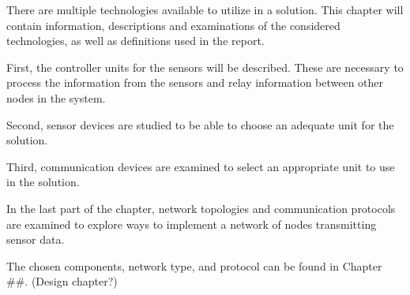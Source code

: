 \label{cha:technologies}
There are multiple technologies available to utilize in a solution. This chapter will contain information, descriptions and examinations of the considered technologies, as well as definitions used in the report.

First, the controller units for the sensors will be described. These are necessary to process the information from the sensors and relay information between other nodes in the system.

Second, sensor devices are studied to be able to choose an adequate unit for the solution.

Third, communication devices are examined to select an appropriate unit to use in the solution. 

In the last part of the chapter, network topologies and communication protocols are examined to explore ways to implement a network of nodes transmitting sensor data.

The chosen components, network type, and protocol can be found in Chapter \#\#. (Design chapter?)








